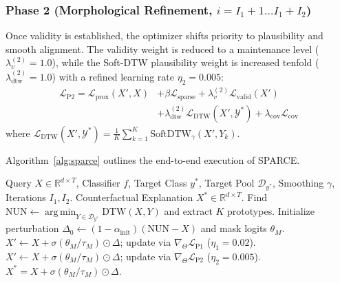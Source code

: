 \documentclass[conference]{IEEEtran}
\newcommand{\R}{\mathbb{R}}
\DeclareMathOperator*{\argmin}{arg\,min}
\begin{document}
\subsubsection{Phase 2 (Morphological Refinement, $i = I_1+1 \dots I_1+I_2$)}
Once validity is established, the optimizer shifts priority to plausibility and smooth alignment. The validity weight is reduced to a maintenance level ($\lambda_v^{(2)} = 1.0$), while the Soft-DTW plausibility weight is increased tenfold ($\lambda_{\text{dtw}}^{(2)} = 1.0$) with a refined learning rate $\eta_2 = 0.005$:
\begin{align}
    \mathcal{L}_{\text{P2}} = \mathcal{L}_{\text{prox}}(X', X) &+ \beta \mathcal{L}_{\text{sparse}} + \lambda_v^{(2)} \mathcal{L}_{\text{valid}}(X') \nonumber \\
    &+ \lambda_{\text{dtw}}^{(2)} \mathcal{L}_{\text{DTW}}(X', \mathcal{Y}^*) + \lambda_{\text{cov}} \mathcal{L}_{\text{cov}}
\end{align}
where $\mathcal{L}_{\text{DTW}}(X', \mathcal{Y}^*) = \frac{1}{K}\sum_{k=1}^K \text{SoftDTW}_\gamma(X', Y_k)$.

Algorithm~\ref{alg:sparce} outlines the end-to-end execution of SPARCE.

\begin{algorithm}[!t]
\caption{SPARCE Counterfactual Generation Pipeline}
\label{alg:sparce}
\footnotesize
\begin{algorithmic}[1]
\REQUIRE Query $X \in \R^{d \times T}$, Classifier $f$, Target Class $y^*$, Target Pool $\mathcal{D}_{y^*}$, Smoothing $\gamma$, Iterations $I_1, I_2$.
\ENSURE Counterfactual Explanation $X^* \in \R^{d \times T}$.
\STATE Find $\text{NUN} \leftarrow \argmin_{Y \in \mathcal{D}_{y^*}} \text{DTW}(X, Y)$ and extract $K$ prototypes.
\STATE Initialize perturbation $\Delta_0 \leftarrow (1 - \alpha_{\text{init}})(\text{NUN} - X)$ and mask logits $\theta_M$.
    \STATE $X' \leftarrow X + \sigma(\theta_M / \tau_M) \odot \Delta$; update via $\nabla_\Theta \mathcal{L}_{\text{P1}}$ ($\eta_1 = 0.02$).
\ENDFOR
{}
    \STATE $X' \leftarrow X + \sigma(\theta_M / \tau_M) \odot \Delta$; update via $\nabla_\Theta \mathcal{L}_{\text{P2}}$ ($\eta_2 = 0.005$).
\ENDFOR
\RETURN $X^* = X + \sigma(\theta_M / \tau_M) \odot \Delta$.
\end{algorithmic}
\end{algorithm}
\end{document}
